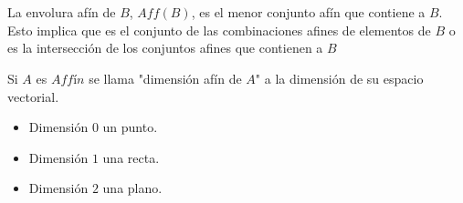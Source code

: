 \begin{def.}\,\\\\
    La envolura afín de $B$, $Aff(B)$, es el menor conjunto afín que contiene a $B$. Esto implica que es el conjunto de las combinaciones afines de elementos de $B$ o es la intersección de los conjuntos afines que contienen a $B$ 
\end{def.}

\begin{def.}
    Si $A$ es $Affín$ se llama "dimensión afín de $A$" a la dimensión de su espacio vectorial.
\end{def.}

\begin{itemize}
    \item Dimensión $0$ un punto.
    \item Dimensión $1$ una recta.
    \item Dimensión $2$ una plano.
\end{itemize}
